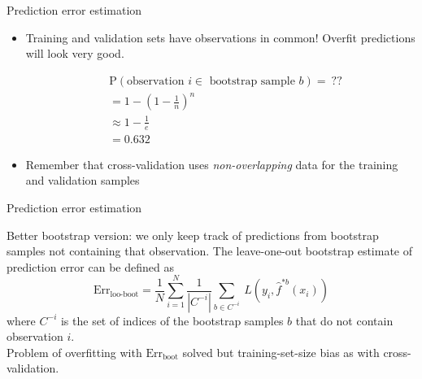 \documentclass[14pt]{beamer}
\begin{document}
\begin{frame}[plain]{Prediction error estimation}
%

\begin{itemize}
	\item Training and validation sets have observations in common! Overfit predictions will look very good.
		
\begin{align*}
	&\text{P}(\text{observation~} i \in \text{~bootstrap sample~} b) = ~??\\
	&= 1 - (1 - \frac1n)^n \\
	&\approx 1 - \frac1e \\
	&= 0.632
\end{align*}
	
	\item Remember that cross-validation uses \emph{non-overlapping} data for the training and validation samples
\end{itemize}



\end{frame}


\begin{frame}[plain]{Prediction error estimation}

Better bootstrap version: we only keep track of predictions from bootstrap samples not containing that observation. The leave-one-out bootstrap estimate of prediction error can be defined as
\[ 
\text{Err}_{\text{loo-boot}} = \frac1N \sum_{i = 1}^N \frac{1}{|C^{-i}|}\sum_{b \in C^{-i}} \ L(y_i, \hat f^{*b}(x_i))
\]
where $C^{-i}$ is the set of indices of the bootstrap samples $b$ that do not contain observation $i$.\\

Problem of overfitting with $\text{Err}_{\text{boot}}$ solved but training-set-size bias as with cross-validation.

\end{frame}
\end{document}
